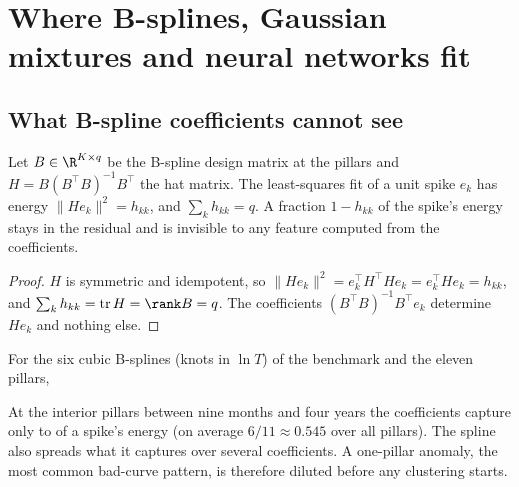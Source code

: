 \section{Where B-splines, Gaussian mixtures and neural networks fit}\label{sec-alternatives}

\subsection{What B-spline coefficients cannot see}
\begin{proposition}\label{prop-leverage}
Let $B\in\R^{K\times q}$ be the B-spline design matrix at the pillars and $H=B(B^\top B)^{-1}B^\top$ the hat matrix. The
least-squares fit of a unit spike $e_k$ has energy $\|He_k\|^2=h_{kk}$, and $\sum_kh_{kk}=q$. A fraction $1-h_{kk}$ of the
spike's energy stays in the residual and is invisible to any feature computed from the coefficients.
\end{proposition}
\begin{proof}
$H$ is symmetric and idempotent, so $\|He_k\|^2=e_k^\top H^\top He_k=e_k^\top He_k=h_{kk}$, and
$\sum_kh_{kk}=\operatorname{tr}H=\rank B=q$. The coefficients $(B^\top B)^{-1}B^\top e_k$ determine $He_k$ and nothing else.
\end{proof}

\begin{example}
For the six cubic B-splines (knots in $\ln T$) of the benchmark and the eleven pillars,
\begin{center}\end{center}
At the interior pillars between nine months and four years the coefficients capture only \vLevMin{} to \vLevMax{} of a
spike's energy (on average $6/11\approx\num{0.545}$ over all pillars). The spline also spreads what it captures over
several coefficients. A one-pillar anomaly, the most common bad-curve pattern, is therefore diluted before any
clustering starts.
\end{example}

